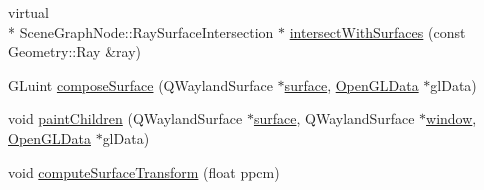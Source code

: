 \begin{DoxyCompactItemize}
virtual \\*
Scene\-Graph\-Node\-::\-Ray\-Surface\-Intersection $\ast$ \hyperlink{classQtwaylandSurfaceNode_a82a9f9f93675df011cfd350a1857ea8b}{intersect\-With\-Surfaces} (const Geometry\-::\-Ray \&ray)
\item 
G\-Luint \hyperlink{classQtwaylandSurfaceNode_a16ad301303ca42fa9a2ad3d1799cf1a2}{compose\-Surface} (Q\-Wayland\-Surface $\ast$\hyperlink{simple-egl_8cpp_a0720952aa1caded45b5bcdce589663a9}{surface}, \hyperlink{classOpenGLData}{Open\-G\-L\-Data} $\ast$gl\-Data)
\item 
void \hyperlink{classQtwaylandSurfaceNode_a0de0e4cbe5312d91334e091160ac4bce}{paint\-Children} (Q\-Wayland\-Surface $\ast$\hyperlink{simple-egl_8cpp_a0720952aa1caded45b5bcdce589663a9}{surface}, Q\-Wayland\-Surface $\ast$\hyperlink{structwindow}{window}, \hyperlink{classOpenGLData}{Open\-G\-L\-Data} $\ast$gl\-Data)
\item 
void \hyperlink{classQtwaylandSurfaceNode_a9917572c6241c4a7593b4c9cd9f8c290}{compute\-Surface\-Transform} (float ppcm)
\end{DoxyCompactItemize}


